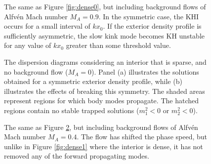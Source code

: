 \documentclass[12pt]{ociamthesis}
\begin{document}
\begin{figure}[t]
\centering
{}
\caption{The same as Figure \ref{fig:dense0}, but including background flows of Alfv\'en Mach number $M_A = 0.9$.
In the symmetric case, the KHI occurs for a small interval of $k x_0$.
If the exterior density profile is sufficiently asymmetric, the slow kink mode becomes KH unstable for any value of $k x_0$ greater than some threshold value.}
\label{fig:dense3}
\end{figure}

\begin{figure}[t]
\centering
{}
\caption{The dispersion diagrams considering an interior that is sparse, and no background flow ($M_A = 0$).
Panel (a) illustrates the solutions obtained for a symmetric exterior density profile, while (b) illustrates the effects of breaking this symmetry.
The shaded areas represent regions for which body modes propagate.
The hatched regions contain no stable trapped solutions ($m_1^2 < 0$ or $m_2^2 < 0$).}
\label{fig:evacuated0}
\end{figure}

\begin{figure}[t]
\centering
{}
\caption{The same as Figure \ref{fig:evacuated0}, but including background flows of Alfv\'en Mach number $M_A = 0.4$.
The flow has shifted the phase speed, but unlike in Figure \ref{fig:dense1} where the interior is dense, it has not removed any of the forward propagating modes.}
\label{fig:evacuated1}
\end{figure}
\end{document}
